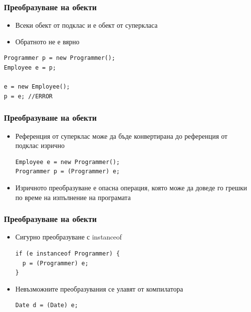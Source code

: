 \documentclass{beamer}
\begin{document}
\begin{frame}[fragile]
  \frametitle{Преобразуване на обекти}
  \transdissolve
  \begin{itemize}
  \item Всеки обект от подклас и е обект от суперкласа \pause
  \item Обратното не е вярно \pause
  \end{itemize}
\begin{lstlisting}
Programmer p = new Programmer();
Employee e = p;

e = new Employee();
p = e; //ERROR
\end{lstlisting}
\end{frame}

\begin{frame}[fragile]
  \frametitle{Преобразуване на обекти}
  \transdissolve
  \begin{itemize}
  \item Референция от суперклас може да бъде конвертирана до
    референция от подклас изрично
    \begin{lstlisting}
Employee e = new Programmer();
Programmer p = (Programmer) e;
    \end{lstlisting}
  \item Изричното преобразуване е опасна операция, която може да
    доведе го грешки по време на изпълнение на програмата
  \end{itemize}
\end{frame}

\begin{frame}[fragile]
  \frametitle{Преобразуване на обекти}
  \transdissolve
  \begin{itemize}
  \item Сигурно преобразуване с instanceof
    \begin{lstlisting}
if (e instanceof Programmer) {
  p = (Programmer) e;
}
    \end{lstlisting}
  \item Невъзможните преобразувания се улавят от компилатора
    \begin{lstlisting}
Date d = (Date) e;
    \end{lstlisting}
  \end{itemize}
\end{frame}
\end{document}
